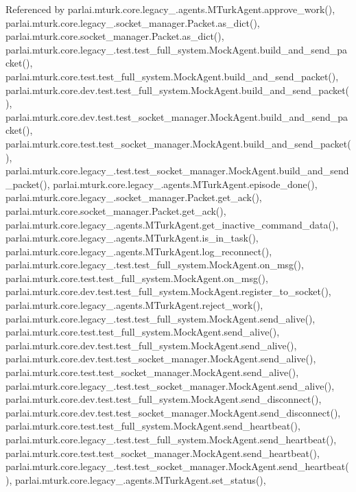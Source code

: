Referenced by parlai.\+mturk.\+core.\+legacy\+\_.\+agents.\+M\+Turk\+Agent.\+approve\+\_\+work(), parlai.\+mturk.\+core.\+legacy\+\_.\+socket\+\_\+manager.\+Packet.\+as\+\_\+dict(), parlai.\+mturk.\+core.\+socket\+\_\+manager.\+Packet.\+as\+\_\+dict(), parlai.\+mturk.\+core.\+legacy\+\_.\+test.\+test\+\_\+full\+\_\+system.\+Mock\+Agent.\+build\+\_\+and\+\_\+send\+\_\+packet(), parlai.\+mturk.\+core.\+test.\+test\+\_\+full\+\_\+system.\+Mock\+Agent.\+build\+\_\+and\+\_\+send\+\_\+packet(), parlai.\+mturk.\+core.\+dev.\+test.\+test\+\_\+full\+\_\+system.\+Mock\+Agent.\+build\+\_\+and\+\_\+send\+\_\+packet(), parlai.\+mturk.\+core.\+dev.\+test.\+test\+\_\+socket\+\_\+manager.\+Mock\+Agent.\+build\+\_\+and\+\_\+send\+\_\+packet(), parlai.\+mturk.\+core.\+test.\+test\+\_\+socket\+\_\+manager.\+Mock\+Agent.\+build\+\_\+and\+\_\+send\+\_\+packet(), parlai.\+mturk.\+core.\+legacy\+\_.\+test.\+test\+\_\+socket\+\_\+manager.\+Mock\+Agent.\+build\+\_\+and\+\_\+send\+\_\+packet(), parlai.\+mturk.\+core.\+legacy\+\_.\+agents.\+M\+Turk\+Agent.\+episode\+\_\+done(), parlai.\+mturk.\+core.\+legacy\+\_.\+socket\+\_\+manager.\+Packet.\+get\+\_\+ack(), parlai.\+mturk.\+core.\+socket\+\_\+manager.\+Packet.\+get\+\_\+ack(), parlai.\+mturk.\+core.\+legacy\+\_.\+agents.\+M\+Turk\+Agent.\+get\+\_\+inactive\+\_\+command\+\_\+data(), parlai.\+mturk.\+core.\+legacy\+\_.\+agents.\+M\+Turk\+Agent.\+is\+\_\+in\+\_\+task(), parlai.\+mturk.\+core.\+legacy\+\_.\+agents.\+M\+Turk\+Agent.\+log\+\_\+reconnect(), parlai.\+mturk.\+core.\+legacy\+\_.\+test.\+test\+\_\+full\+\_\+system.\+Mock\+Agent.\+on\+\_\+msg(), parlai.\+mturk.\+core.\+test.\+test\+\_\+full\+\_\+system.\+Mock\+Agent.\+on\+\_\+msg(), parlai.\+mturk.\+core.\+dev.\+test.\+test\+\_\+full\+\_\+system.\+Mock\+Agent.\+register\+\_\+to\+\_\+socket(), parlai.\+mturk.\+core.\+legacy\+\_.\+agents.\+M\+Turk\+Agent.\+reject\+\_\+work(), parlai.\+mturk.\+core.\+legacy\+\_.\+test.\+test\+\_\+full\+\_\+system.\+Mock\+Agent.\+send\+\_\+alive(), parlai.\+mturk.\+core.\+test.\+test\+\_\+full\+\_\+system.\+Mock\+Agent.\+send\+\_\+alive(), parlai.\+mturk.\+core.\+dev.\+test.\+test\+\_\+full\+\_\+system.\+Mock\+Agent.\+send\+\_\+alive(), parlai.\+mturk.\+core.\+dev.\+test.\+test\+\_\+socket\+\_\+manager.\+Mock\+Agent.\+send\+\_\+alive(), parlai.\+mturk.\+core.\+test.\+test\+\_\+socket\+\_\+manager.\+Mock\+Agent.\+send\+\_\+alive(), parlai.\+mturk.\+core.\+legacy\+\_.\+test.\+test\+\_\+socket\+\_\+manager.\+Mock\+Agent.\+send\+\_\+alive(), parlai.\+mturk.\+core.\+dev.\+test.\+test\+\_\+full\+\_\+system.\+Mock\+Agent.\+send\+\_\+disconnect(), parlai.\+mturk.\+core.\+dev.\+test.\+test\+\_\+socket\+\_\+manager.\+Mock\+Agent.\+send\+\_\+disconnect(), parlai.\+mturk.\+core.\+test.\+test\+\_\+full\+\_\+system.\+Mock\+Agent.\+send\+\_\+heartbeat(), parlai.\+mturk.\+core.\+legacy\+\_.\+test.\+test\+\_\+full\+\_\+system.\+Mock\+Agent.\+send\+\_\+heartbeat(), parlai.\+mturk.\+core.\+test.\+test\+\_\+socket\+\_\+manager.\+Mock\+Agent.\+send\+\_\+heartbeat(), parlai.\+mturk.\+core.\+legacy\+\_.\+test.\+test\+\_\+socket\+\_\+manager.\+Mock\+Agent.\+send\+\_\+heartbeat(), parlai.\+mturk.\+core.\+legacy\+\_.\+agents.\+M\+Turk\+Agent.\+set\+\_\+status(), 